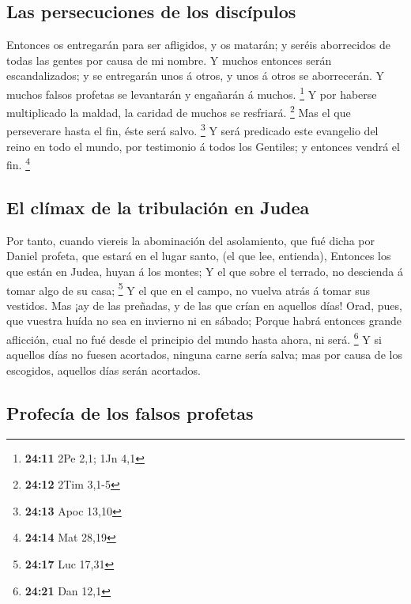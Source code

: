 \hypertarget{las-persecuciones-de-los-discuxedpulos}{%
\subsection{Las persecuciones de los
discípulos}\label{las-persecuciones-de-los-discuxedpulos}}

 Entonces os entregarán para ser afligidos, y os matarán;
y seréis aborrecidos de todas las gentes por causa de mi nombre.
 Y muchos entonces serán escandalizados; y se entregarán
unos á otros, y unos á otros se aborrecerán.  Y muchos
falsos profetas se levantarán y engañarán á muchos. \footnote{\textbf{24:11}
  2Pe 2,1; 1Jn 4,1}  Y por haberse multiplicado la
maldad, la caridad de muchos se resfriará. \footnote{\textbf{24:12} 2Tim
  3,1-5}  Mas el que perseverare hasta el fin, éste será
salvo. \footnote{\textbf{24:13} Apoc 13,10}  Y será
predicado este evangelio del reino en todo el mundo, por testimonio á
todos los Gentiles; y entonces vendrá el fin. \footnote{\textbf{24:14}
  Mat 28,19}

\hypertarget{el-cluxedmax-de-la-tribulaciuxf3n-en-judea}{%
\subsection{El clímax de la tribulación en
Judea}\label{el-cluxedmax-de-la-tribulaciuxf3n-en-judea}}

 Por tanto, cuando viereis la abominación del
asolamiento, que fué dicha por Daniel profeta, que estará en el lugar
santo, (el que lee, entienda),  Entonces los que están en
Judea, huyan á los montes;  Y el que sobre el terrado, no
descienda á tomar algo de su casa; \footnote{\textbf{24:17} Luc 17,31}
 Y el que en el campo, no vuelva atrás á tomar sus
vestidos.  Mas ¡ay de las preñadas, y de las que crían en
aquellos días!  Orad, pues, que vuestra huída no sea en
invierno ni en sábado;  Porque habrá entonces grande
aflicción, cual no fué desde el principio del mundo hasta ahora, ni
será. \footnote{\textbf{24:21} Dan 12,1}  Y si aquellos
días no fuesen acortados, ninguna carne sería salva; mas por causa de
los escogidos, aquellos días serán acortados.

\hypertarget{profecuxeda-de-los-falsos-profetas}{%
\subsection{Profecía de los falsos
profetas}\label{profecuxeda-de-los-falsos-profetas}}

